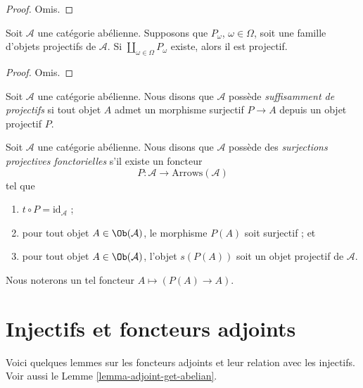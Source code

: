 \begin{proof}
Omis.
\end{proof}

\begin{lemma}
\label{lemma-coproduct-projectives}
Soit $\mathcal{A}$ une catégorie abélienne.
Supposons que $P_\omega$, $\omega \in \Omega$, soit une famille d'objets
projectifs de $\mathcal{A}$. Si $\coprod_{\omega \in \Omega} P_\omega$
existe, alors il est projectif.
\end{lemma}

\begin{proof}
Omis.
\end{proof}

\begin{definition}
\label{definition-enough-projectives}
Soit $\mathcal{A}$ une catégorie abélienne.
Nous disons que $\mathcal{A}$ possède {\it suffisamment de projectifs}
si tout objet $A$ admet un morphisme surjectif
$P \to A$ depuis un objet projectif $P$.
\end{definition}

\begin{definition}
\label{definition-functorial-projective-surjections}
Soit $\mathcal{A}$ une catégorie abélienne.
Nous disons que $\mathcal{A}$ possède des
{\it surjections projectives fonctorielles}
s'il existe un foncteur
$$
P : \mathcal{A} \longrightarrow \text{Arrows}(\mathcal{A})
$$
tel que
\begin{enumerate}
\item $t \circ P = \text{id}_\mathcal{A}$ ;
\item pour tout objet $A \in \Ob(\mathcal{A})$,
le morphisme $P(A)$ soit surjectif ; et
\item pour tout objet $A \in \Ob(\mathcal{A})$,
l'objet $s(P(A))$ soit un objet projectif de $\mathcal{A}$.
\end{enumerate}
Nous noterons un tel foncteur
$A \mapsto (P(A) \to A)$.
\end{definition}

\section{Injectifs et foncteurs adjoints}
\label{section-adjoint}

\noindent
Voici quelques lemmes sur les foncteurs adjoints et leur relation avec
les injectifs. Voir aussi le Lemme \ref{lemma-adjoint-get-abelian}.

